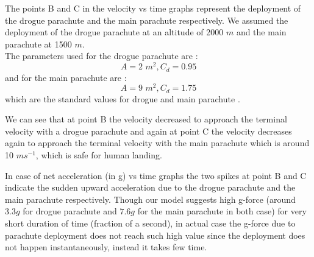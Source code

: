 \documentclass[a4paper, 14pt]{extarticle}
\begin{document}
The points B and C in the velocity vs time graphs represent the deployment of the drogue parachute and the main parachute respectively. We assumed the deployment of the drogue parachute at an altitude of 2000 $m$ and the main parachute at 1500 $m$.\\ The parameters used for the drogue parachute are : $$A = \text{2 }m^2, C_d = 0.95$$ and for the main parachute are : $$A =\text{9 }m^2, C_d = 1.75$$
which are the standard values for drogue and main parachute \citep{nasa-rocket-recovery}.

We can see that at point B the velocity decreased to approach the terminal velocity with a drogue parachute and again at point C the velocity decreases again to approach the terminal velocity with the main parachute which is around 10 $ms^{-1}$, which is safe for human landing.

In case of net acceleration (in g) vs time graphs the two spikes at point B and C indicate the sudden upward acceleration due to the drogue parachute and the main parachute respectively. Though our model suggests high g-force (around $3.3g$ for drogue parachute and $7.6g$ for the main parachute in both case) for very short duration of time (fraction of a second), in actual case the g-force due to parachute deployment does not reach such high value since the deployment does not happen instantaneously, instead it takes few time.
\end{document}
